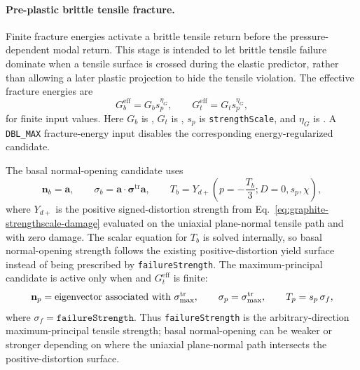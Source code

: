 \paragraph{Pre-plastic brittle tensile fracture.}
Finite fracture energies activate a brittle tensile return before the pressure-dependent modal return.  This stage is intended to let brittle tensile failure dominate when a tensile surface is crossed during the elastic predictor, rather than allowing a later plastic projection to hide the tensile violation.  The effective fracture energies are
\begin{equation}
  G_b^{\mathrm{eff}} = G_b s_p^{\eta_G},
  \qquad
  G_t^{\mathrm{eff}} = G_t s_p^{\eta_G},
  \label{eq:graphite-effective-fracture-energy}
\end{equation}
for finite input values. Here $G_b$ is , $G_t$ is , $s_p$ is \texttt{strengthScale}, and $\eta_G$ is .  A \texttt{DBL\_MAX} fracture-energy input disables the corresponding energy-regularized candidate.

The basal normal-opening candidate uses
\begin{equation}
  \mathbf n_b=\mathbf a,
  \qquad
  \sigma_b=\mathbf a\cdot\boldsymbol{\sigma}^{\mathrm{tr}}\mathbf a,
  \qquad
  T_b=Y_{d+}\!\left(p=-\frac{T_b}{3};D=0,s_p,\chi\right),
  \label{eq:graphite-basal-tensile-strength}
\end{equation}
where \(Y_{d+}\) is the positive signed-distortion strength from Eq.~\eqref{eq:graphite-strengthscale-damage} evaluated on the uniaxial plane-normal tensile path and with zero damage.  The scalar equation for \(T_b\) is solved internally, so basal normal-opening strength follows the existing positive-distortion yield surface instead of being prescribed by \texttt{failureStrength}.  The maximum-principal candidate is active only when  and \(G_t^{\mathrm{eff}}\) is finite:
\begin{equation}
  \mathbf n_p=\hbox{eigenvector associated with }\sigma_{\max}^{\mathrm{tr}},
  \qquad
  \sigma_p=\sigma_{\max}^{\mathrm{tr}},
  \qquad
  T_p=s_p\,\sigma_f,
  \label{eq:graphite-principal-tensile-strength}
\end{equation}
where \(\sigma_f=\texttt{failureStrength}\).  Thus \texttt{failureStrength} is the arbitrary-direction maximum-principal tensile strength; basal normal-opening can be weaker or stronger depending on where the uniaxial plane-normal path intersects the positive-distortion surface.

